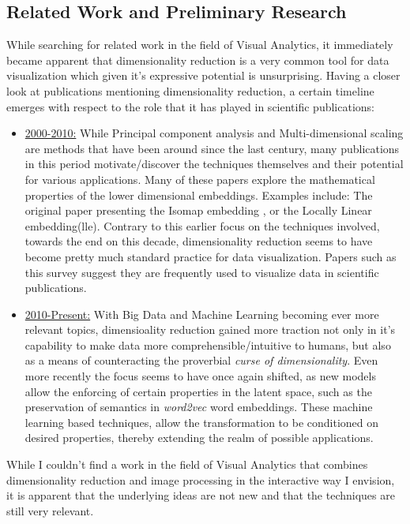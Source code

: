 \documentclass[11pt,a4paper]{article}
\begin{document}
  \subsection{Related Work and Preliminary Research}
    While searching for related work in the field of Visual Analytics, it immediately became apparent that dimensionality reduction is a very common tool for data visualization which given it's expressive potential is unsurprising. 
    Having a closer look at publications mentioning dimensionality reduction, a certain timeline emerges with respect to the role that it has played in scientific publications:
    \begin{itemize}
      \item \underline{2000-2010:} While Principal component analysis and Multi-dimensional scaling are methods that have been around since the last century, many publications in this period motivate/discover the techniques themselves and their potential for various applications. Many of these papers explore the mathematical properties of the lower dimensional embeddings. Examples include: The original paper presenting the Isomap embedding \cite{tenenbaum_global_2000},%
      or the Locally Linear embedding(lle)\cite{roweis_nonlinear_2000}. %
      Contrary to this earlier focus on the techniques involved, towards the end on this decade, dimensionality reduction seems to have become pretty much standard practice for data visualization. Papers such as this survey \cite{zhang_manifold_2010}%
      suggest they are frequently used to visualize data in scientific publications.
      \item \underline{2010-Present:} With Big Data and Machine Learning becoming ever more relevant topics, dimensioality reduction gained more traction not only in it's capability to make data more comprehensible/intuitive to humans, but also as a means of counteracting the proverbial \textit{curse of dimensionality}. Even more recently the focus seems to have once again shifted, as new models allow the enforcing of certain properties in the latent space, such as the preservation of semantics in \textit{word2vec}\cite{mikolov_efficient_2013} %
      word embeddings. These machine learning based techniques, allow the transformation to be conditioned on desired properties, thereby extending the realm of possible applications.
    \end{itemize}

    While I couldn't find a work in the field of Visual Analytics that combines dimensionality reduction and image processing in the interactive way I envision, it is apparent that the underlying ideas are not new and that the techniques are still very relevant.
  
\end{document}
